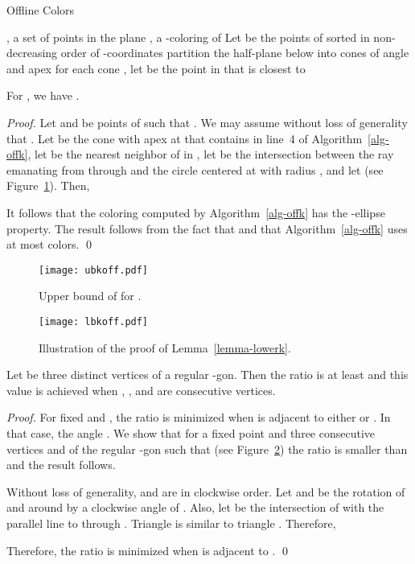\documentclass[pdftex,leqno,fleqn,12pts]{llncs}
\begin{document}
\begin{algorithm}
\caption{Offline  Colors}\label{alg-offk}
\begin{algorithmic}[1]
\REQUIRE , a set of points in the plane 
\ENSURE , a -coloring of  
\STATE Let  be the points of  sorted in non-decreasing 
order of -coordinates 
\STATE partition the half-plane below  into  cones of
angle  and apex  
\STATE for each cone , let  be the point in  that is 
closest to  
\STATE  
\ENDFOR
\end{algorithmic}
\end{algorithm}


\begin{lemma} \label{prop-ubkoff}
For , we have .
\end{lemma}
\begin{proof}
Let  and  be points of  such that . We may assume 
without loss of generality that . Let  be 
the cone with apex at  that contains  in line~4 of 
Algorithm~\ref{alg-offk}, let  be the nearest neighbor of  in , 
let  be the intersection between the ray emanating from  through  
and the circle centered at  with radius ,
and let  (see Figure~\ref{fig-ubkoff}). Then,
 
It follows that the coloring computed by Algorithm~\ref{alg-offk} 
has the -ellipse property. The result follows 
from the fact that  and that Algorithm~\ref{alg-offk} 
uses at most  colors.
\qed 
\end{proof}

\begin{figure}
\centering\texttt{[image: ubkoff.pdf]}
\caption{Upper bound of  for .}
\label{fig-ubkoff}
\end{figure}

\begin{figure}
\centering\texttt{[image: lbkoff.pdf]}
\caption{Illustration of the proof of Lemma~\ref{lemma-lowerk}.}
\label{fig-lbkoff}
\end{figure}

\begin{lemma}\label{lemma-lowerk} Let  be three distinct vertices of a regular -gon. 
Then the ratio  is at least  and this value is achieved  
when , , and  are consecutive vertices. 
\end{lemma}
\begin{proof} 
For fixed  and , the ratio  is minimized
when  is adjacent to either  or . In that case, the angle .
We show that for a fixed point  and three consecutive vertices  and 
of the regular -gon such that  (see Figure~\ref{fig-lbkoff})
the ratio  is smaller than  and
the result follows.

Without loss of generality,  and  are in clockwise order. Let  and 
be the rotation of  and  around  by a clockwise angle of . Also, let 
be the intersection of  with the parallel line to  
through . Triangle  is similar to triangle .
Therefore, 

Therefore, the ratio  is minimized when  is adjacent to . 
\qed 
\end{proof}
\end{document}

